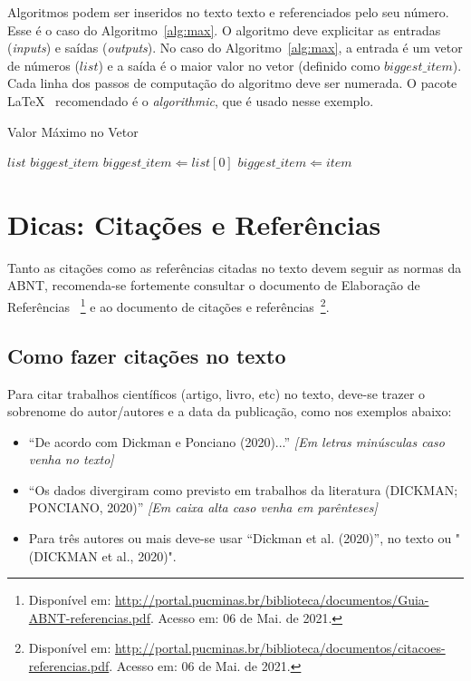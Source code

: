 \documentclass[a4paper,12pt]{article}
\begin{document}
Algoritmos podem ser inseridos no texto texto e referenciados pelo seu número. Esse é o caso do Algoritmo~\ref{alg:max}. O algoritmo deve explicitar as entradas (\textit{inputs}) e saídas (\textit{outputs}). No caso do Algoritmo~\ref{alg:max}, a entrada é um vetor de números ($list$) e a saída é o maior valor no vetor (definido como $biggest\_item$). Cada linha dos passos de computação do algoritmo deve ser numerada. O pacote \LaTeX~ recomendado é o \textit{algorithmic}, que é usado nesse exemplo.

\begin{algorithm}
\caption{Valor Máximo no Vetor}
\label{alg:max}
\begin{algorithmic}[1]
\REQUIRE $list$
\ENSURE $biggest\_item$
    \STATE $biggest\_item \Leftarrow list[0]$
            \STATE $biggest\_item \Leftarrow item$
        \ENDIF
    \ENDFOR
\end{algorithmic}
\end{algorithm}

\section{Dicas: Citações e Referências}
\label{sec:ref}

Tanto as citações como as referências citadas no texto devem seguir as normas da ABNT, recomenda-se fortemente consultar o documento de Elaboração de Referências~\cite{manualpucref} \footnote{Disponível em: \url{http://portal.pucminas.br/biblioteca/documentos/Guia-ABNT-referencias.pdf}. Acesso em: 06 de Mai. de 2021.} e ao documento de citações e referências~\cite{manualpuccit}\footnote{Disponível em: \url{http://portal.pucminas.br/biblioteca/documentos/citacoes-referencias.pdf}. Acesso em: 06 de Mai. de 2021.}.

\subsection{Como fazer citações no texto}

Para citar trabalhos científicos (artigo, livro, etc) no texto, deve-se trazer o sobrenome do autor/autores e a data da publicação, como nos exemplos abaixo:

\begin{itemize}
    \item ``De acordo com Dickman e Ponciano (2020)...'' \textit{[Em letras minúsculas caso venha no texto]}
    \item ``Os dados divergiram como previsto em trabalhos da literatura (DICKMAN; PONCIANO, 2020)'' \textit{[Em caixa alta caso venha em parênteses]}
    \item Para três autores ou mais deve-se usar ``Dickman et al. (2020)'', no texto ou "(DICKMAN et al., 2020)".
\end{itemize}
\end{document}
